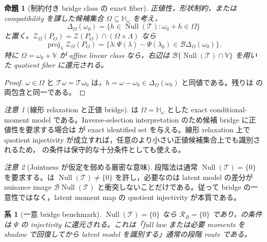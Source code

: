 \documentclass[11pt,a4paper]{ltjsarticle}
\newtheorem{proposition}{命題}[section]
\newtheorem{corollary}{系}[section]
\theoremstyle{remark}
\newtheorem{remark}{注意}[section]
\newcommand{\cR}{\mathcal R}
\newcommand{\cZ}{\mathcal Z}
\newcommand{\Top}{\mathscr T}
\newcommand{\Bop}{\mathscr B}
\newcommand{\Null}{\operatorname{Null}}
\begin{document}
\begin{proposition}[制約付き bridge class の exact fiber]\label{prop:constrainedfiber}
正値性，形状制約，または compatibility を課した候補集合 $\Omega\subseteq\mathbb H_\omega$ を考え，
\[
\Delta_\Omega(\omega_0)
=\{h\in\Null(\Top):\omega_0+h\in\Omega\}
\]
と置く。$\cZ_\Omega(P_O)=\cZ(P_O)\cap(\Omega\times\Lambda)$ なら
\begin{equation}
\operatorname{proj}_\lambda\cZ_\Omega(P_O)
=\{\lambda:\Psi(\lambda)-\Psi(\lambda_0)
\in\Bop\Delta_\Omega(\omega_0)\}.
\label{eq:constrainedfiber}
\end{equation}
特に $\Omega=\omega_0+\mathbb V$ が affine linear class なら，右辺は
$\Bop\{\Null(\Top)\cap\mathbb V\}$ を用いた quotient fiber に還元される。
\end{proposition}

\begin{proof}
$\omega\in\Omega$ と $\Top\omega=\Top\omega_0$ は，$h=\omega-\omega_0\in\Delta_\Omega(\omega_0)$ と同値である。残りは  の両包含と同一である。
\end{proof}

\begin{remark}[線形 relaxation と正値 bridge]
 は $\Omega=\mathbb H_\omega$ とした exact conditional-moment model である。Inverse-selection interpretation のため候補 bridge に正値性を要求する場合は  が exact identified set を与える。線形 relaxation 上で quotient injectivity が成立すれば，任意のより小さい正値候補集合上でも識別されるため， の条件は保守的な十分条件としても使える。
\end{remark}

\begin{remark}[Jointness が仮定を弱める厳密な意味]
段階法は通常 $\Null(\Top)=\{0\}$ を要求する。は $\Null(\Top)\neq\{0\}$ を許し，必要なのは latent model の差分が nuisance image $\Bop\Null(\Top)$ と衝突しないことだけである。従って bridge の一意性ではなく，latent moment map の quotient injectivity が本質である。
\end{remark}

\begin{corollary}[一意 bridge benchmark]\label{cor:uniquebridge}
$\Null(\Top)=\{0\}$ なら $\cR_B=\{0\}$ であり，の条件は $\Psi$ の injectivity に還元される。これは「full law または必要 moments を shadow で回復してから latent model を識別する」通常の段階 route である。
\end{corollary}
\end{document}
